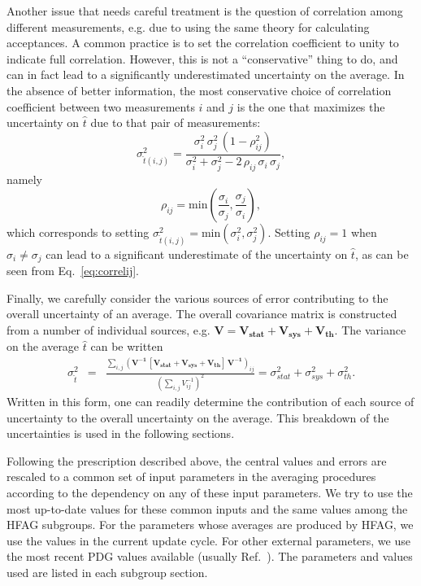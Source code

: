 
Another issue that needs careful treatment is the question of correlation
among different measurements, e.g. due to using the same theory for
calculating acceptances.  A common practice is to set the correlation
coefficient to unity to indicate full correlation.  However, this is
not a ``conservative'' thing to do, and can in fact lead to a significantly
underestimated uncertainty on the average.  In the absence of
better information, the most conservative choice of correlation coefficient
between two measurements $i$ and $j$
is the one that maximizes the uncertainty on $\hat{t}$
due to that pair of measurements:
\begin{equation}
\sigma_{\hat{t}(i,j)}^2 = \frac{\sigma_i^2\,\sigma_j^2\,(1-\rho_{ij}^2)}
   {\sigma_i^2 + \sigma_j^2 - 2\,\rho_{ij}\,\sigma_i\,\sigma_j} ,
\label{eq:correlij}
\end{equation}
namely
\begin{equation}
\rho_{ij} = \mathrm{min}\left(\frac{\sigma_i}{\sigma_j},\frac{\sigma_j}{\sigma_i}\right) ,
\label{eq:correlrho}
\end{equation}
which corresponds to setting $\sigma_{\hat{t}(i,j)}^2=\mathrm{min}(\sigma_i^2,\sigma_j^2)$.
Setting $\rho_{ij}=1$ when $\sigma_i\ne\sigma_j$ can lead to a significant
underestimate of the uncertainty on $\hat{t}$, as can be seen
from Eq.~\ref{eq:correlij}.

Finally, we carefully consider the various sources of error
contributing to the overall uncertainty of an average.
The overall covariance matrix is constructed from a number of
individual sources, e.g.
$\mathbf{V} = \mathbf{V_{stat}+V_{sys}+V_{th}}$.
The variance on the average $\hat{t}$ can be written
\begin{eqnarray}
\sigma^2_{\hat{t}} 
 &=& 
\frac{ \sum_{i,j}\left(\mathbf{V^{-1}}\, 
\mathbf{[V_{stat}+V_{sys}+V_{th}]}\, \mathbf{V^{-1}}\right)_{ij}}
{\left(\sum_{i,j} V^{-1}_{ij}\right)^2}
= \sigma^2_{stat} + \sigma^2_{sys} + \sigma^2_{th} .
\end{eqnarray}
Written in this form, one can readily determine the 
contribution of each source of uncertainty to the overall uncertainty
on the average.  This breakdown of the uncertainties is used 
in the following sections.

Following the prescription described above, the central values and
errors are rescaled to a common set of input parameters in the averaging
procedures according to the dependency on any of these input parameters.
We try to use the most up-to-date values for these common inputs and 
the same values among the HFAG subgroups. For the parameters whose
averages are produced by HFAG, we use the values in the current 
update cycle.  For other external parameters, we use the most
recent PDG values available (usually Ref.~\cite{PDG_2010}). 
The parameters and values used are listed in each subgroup section.
